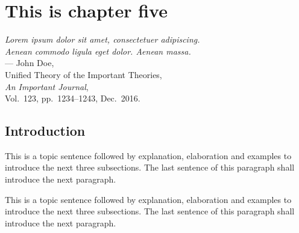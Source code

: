 

%
%
\chapter{This is chapter five}
\label{ch:name5}

\begin{flushright}
{\slshape Lorem ipsum dolor sit amet, consectetuer adipiscing.}\\
{\slshape Aenean commodo ligula eget dolor. Aenean massa.}\\
\medskip
--- John Doe,\\
Unified Theory of the Important Theories,\\
{\slshape An Important Journal},\\
Vol.~123, pp.~1234--1243, Dec.~2016.\\
\end{flushright}

\bigskip




\section{Introduction}
\label{sec:ch_5_introduction}


This is a topic sentence followed by explanation, elaboration and examples to introduce the next three subsections. The last sentence of this paragraph shall introduce the next paragraph. \lipsum[1]

This is a topic sentence followed by explanation, elaboration and examples to introduce the next three subsections. The last sentence of this paragraph shall introduce the next paragraph. \lipsum[1]

